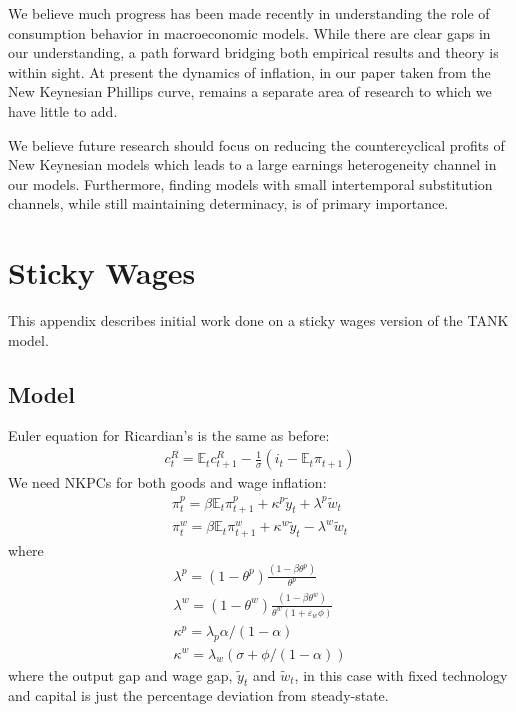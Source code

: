 \documentclass[titlepage]{\econtex}\newcommand{\texname}{ConsumptionHeterogeneity}
\begin{document}
We believe much progress has been made recently in understanding the role of consumption behavior in macroeconomic models. While there are clear gaps in our understanding, a path forward bridging both empirical results and theory is within sight. At present the dynamics of inflation, in our paper taken from the New Keynesian Phillips curve, remains a separate area of research to which we have little to add.

We believe future research should focus on reducing the countercyclical profits of New Keynesian models which leads to a large earnings heterogeneity channel in our models. Furthermore, finding models with small intertemporal substitution channels, while still maintaining determinacy, is of primary importance.



\small

\normalsize
\newpage
\section{Sticky Wages}
This appendix describes initial work done on a sticky wages version of the TANK model.
\subsection{Model}
Euler equation for Ricardian's is the same as before:
\begin{align}
c^R_t = \mathbb{E}_t c^R_{t+1} - \frac{1}{\sigma}(i_t - \mathbb{E}_t\pi_{t+1}) 
\end{align}
We need NKPCs for both goods and wage inflation:
\begin{align}
\pi^p_t=\beta \mathbb{E}_t\pi^p_{t+1}+\kappa^p \tilde{y}_t + \lambda^p \tilde{w}_t \\
\pi^w_t=\beta \mathbb{E}_t\pi^w_{t+1}+\kappa^w \tilde{y}_t - \lambda^w \tilde{w}_t
\end{align}
where
\begin{align}
\lambda^p = (1-\theta^p)\frac{(1-\beta \theta^p)} {\theta^p} \\
\lambda^w = (1-\theta^w)\frac{(1-\beta \theta^w)} {\theta^w (1+\varepsilon_w \phi)} \\
\kappa^p = \lambda_p \alpha/(1-\alpha)  \\
\kappa^w = \lambda_w(\sigma + \phi/(1-\alpha)) 
\end{align}
where the output gap and wage gap, $\tilde{y}_t$ and $\tilde{w}_t$, in this case with fixed technology and capital is just the percentage deviation from steady-state.
\end{document}
